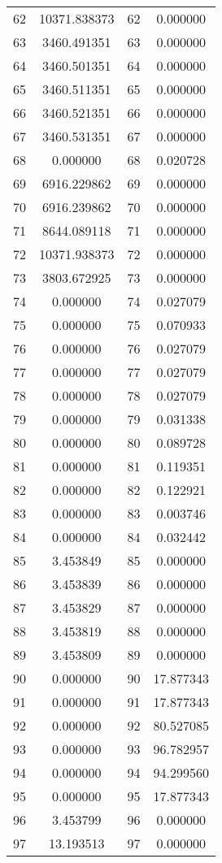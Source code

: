 \documentclass[12pt]{article}
\begin{document}
\begin{longtable}{@{}cccc@{}}
62 & 10371.838373 & 62 & 0.000000 \\
63 & 3460.491351 & 63 & 0.000000 \\
64 & 3460.501351 & 64 & 0.000000 \\
65 & 3460.511351 & 65 & 0.000000 \\
66 & 3460.521351 & 66 & 0.000000 \\
67 & 3460.531351 & 67 & 0.000000 \\
68 & 0.000000 & 68 & 0.020728 \\
69 & 6916.229862 & 69 & 0.000000 \\
70 & 6916.239862 & 70 & 0.000000 \\
71 & 8644.089118 & 71 & 0.000000 \\
72 & 10371.938373 & 72 & 0.000000 \\
73 & 3803.672925 & 73 & 0.000000 \\
74 & 0.000000 & 74 & 0.027079 \\
75 & 0.000000 & 75 & 0.070933 \\
76 & 0.000000 & 76 & 0.027079 \\
77 & 0.000000 & 77 & 0.027079 \\
78 & 0.000000 & 78 & 0.027079 \\
79 & 0.000000 & 79 & 0.031338 \\
80 & 0.000000 & 80 & 0.089728 \\
81 & 0.000000 & 81 & 0.119351 \\
82 & 0.000000 & 82 & 0.122921 \\
83 & 0.000000 & 83 & 0.003746 \\
84 & 0.000000 & 84 & 0.032442 \\
85 & 3.453849 & 85 & 0.000000 \\
86 & 3.453839 & 86 & 0.000000 \\
87 & 3.453829 & 87 & 0.000000 \\
88 & 3.453819 & 88 & 0.000000 \\
89 & 3.453809 & 89 & 0.000000 \\
90 & 0.000000 & 90 & 17.877343 \\
91 & 0.000000 & 91 & 17.877343 \\
92 & 0.000000 & 92 & 80.527085 \\
93 & 0.000000 & 93 & 96.782957 \\
94 & 0.000000 & 94 & 94.299560 \\
95 & 0.000000 & 95 & 17.877343 \\
96 & 3.453799 & 96 & 0.000000 \\
97 & 13.193513 & 97 & 0.000000 \\

\end{longtable}
\end{document}
